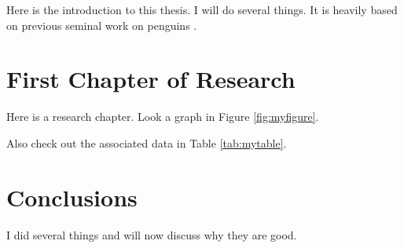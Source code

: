 \documentclass[
  oneside]{ubcthesis}
\begin{document}
Here is the introduction to this thesis. I will do several things. It is heavily based on previous seminal work on penguins \citep{meyer2003pressures}.

\hypertarget{first-chapter-of-research}{%
\chapter{First Chapter of Research}\label{first-chapter-of-research}}

Here is a research chapter. Look a graph in Figure \ref{fig:myfigure}.



Also check out the associated data in Table \ref{tab:mytable}.

\hypertarget{conclusions}{%
\chapter{Conclusions}\label{conclusions}}

I did several things and will now discuss why they are good.

  
\end{document}
